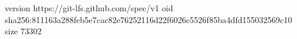 version https://git-lfs.github.com/spec/v1
oid sha256:811163a288feb5e7cac82e76252116d22f6026c5526f85ba4dfd155032569c10
size 73302
